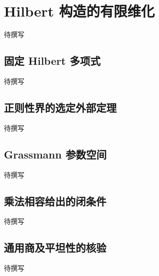 
% 
% 

\section{Hilbert 构造的有限维化}
\label{g5:sec:3302}

待撰写

\subsection{固定 Hilbert 多项式}
\label{g5:subsec:3302:01}
待撰写

\subsection{正则性界的选定外部定理}
\label{g5:subsec:3302:02}
待撰写

\subsection{Grassmann 参数空间}
\label{g5:subsec:3302:03}
待撰写

\subsection{乘法相容给出的闭条件}
\label{g5:subsec:3302:04}
待撰写

\subsection{通用商及平坦性的核验}
\label{g5:subsec:3302:05}
待撰写
